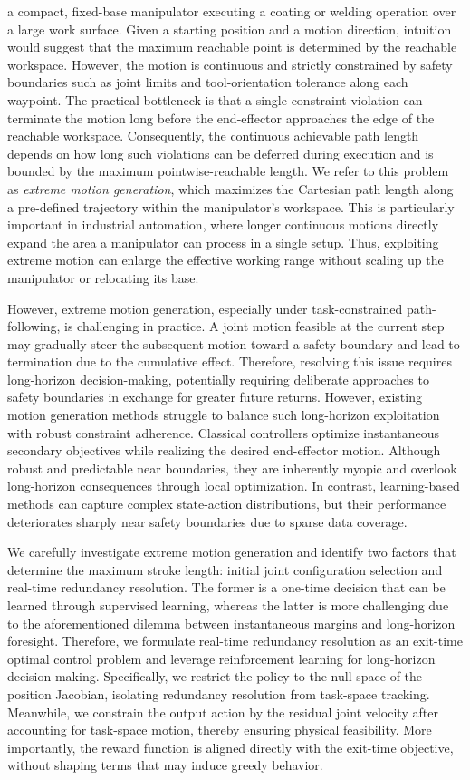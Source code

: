 \documentclass[journal, twoside]{IEEEtran}
\begin{document}
 a compact, fixed-base manipulator executing a coating or welding operation over a large work surface. Given a starting position and a motion direction, intuition would suggest that the maximum reachable point is determined by the reachable workspace. However, the motion is continuous and strictly constrained by safety boundaries such as joint limits and tool-orientation tolerance along each waypoint. The practical bottleneck is that a single constraint violation can terminate the motion long before the end-effector approaches the edge of the reachable workspace. Consequently, the continuous achievable path length depends on how long such violations can be deferred during execution and is bounded by the maximum pointwise-reachable length. We refer to this problem as \textit{extreme motion generation}, which maximizes the Cartesian path length along a pre-defined trajectory within the manipulator's workspace. This is particularly important in industrial automation, where longer continuous motions directly expand the area a manipulator can process in a single setup. Thus, exploiting extreme motion can enlarge the effective working range without scaling up the manipulator or relocating its base.

However, extreme motion generation, especially under task-constrained path-following, is challenging in practice. A joint motion feasible at the current step may gradually steer the subsequent motion toward a safety boundary and lead to termination due to the cumulative effect. Therefore, resolving this issue requires long-horizon decision-making, potentially requiring deliberate approaches to safety boundaries in exchange for greater future returns. However, existing motion generation methods struggle to balance such long-horizon exploitation with robust constraint adherence. Classical controllers optimize instantaneous secondary objectives while realizing the desired end-effector motion. Although robust and predictable near boundaries, they are inherently myopic and overlook long-horizon consequences through local optimization. In contrast, learning-based methods can capture complex state-action distributions, but their performance deteriorates sharply near safety boundaries due to sparse data coverage.

We carefully investigate extreme motion generation and identify two factors that determine the maximum stroke length: initial joint configuration selection and real-time redundancy resolution. The former is a one-time decision that can be learned through supervised learning, whereas the latter is more challenging due to the aforementioned dilemma between instantaneous margins and long-horizon foresight. Therefore, we formulate real-time redundancy resolution as an exit-time optimal control problem and leverage reinforcement learning for long-horizon decision-making. Specifically, we restrict the policy to the null space of the position Jacobian, isolating redundancy resolution from task-space tracking. Meanwhile, we constrain the output action by the residual joint velocity after accounting for task-space motion, thereby ensuring physical feasibility. More importantly, the reward function is aligned directly with the exit-time objective, without shaping terms that may induce greedy behavior.
\end{document}
